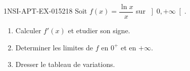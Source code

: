 \begin{exercice}{1NSI-APT-EX-015}{2}{18}
Soit $f(x) = \dfrac{\ln x}{x}$ sur $\left]0, +\infty\right[$.
\begin{enumerate}
  \item Calculer $f'(x)$ et etudier son signe.
  \item Determiner les limites de $f$ en $0^+$ et en $+\infty$.
  \item Dresser le tableau de variations.
\end{enumerate}

\end{exercice}
